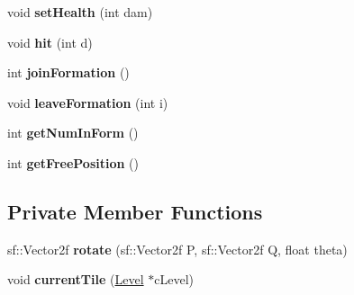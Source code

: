 \begin{DoxyCompactItemize}
void {\bfseries set\+Health} (int dam)
\item 
\mbox{\label{class_player_aafd5c7053af0b22d8ab1235efbc99635}} 
void {\bfseries hit} (int d)
\item 
\mbox{\label{class_player_add99cecd25ff0a29010c6d87c419c990}} 
int {\bfseries join\+Formation} ()
\item 
\mbox{\label{class_player_aec11a56f2f445d25d39cc67609bafbf3}} 
void {\bfseries leave\+Formation} (int i)
\item 
\mbox{\label{class_player_afe599740ba70a105db44bc4bbb9cbbc7}} 
int {\bfseries get\+Num\+In\+Form} ()
\item 
\mbox{\label{class_player_a2499ac296a8437ee4bec6c0bd47f2f5b}} 
int {\bfseries get\+Free\+Position} ()
\end{DoxyCompactItemize}
\subsection*{Private Member Functions}
\begin{DoxyCompactItemize}
\item 
\mbox{\label{class_player_a5419a17a9a89eb5a1db87dedb8b4ff67}} 
sf\+::\+Vector2f {\bfseries rotate} (sf\+::\+Vector2f P, sf\+::\+Vector2f Q, float theta)
\item 
\mbox{\label{class_player_a05ce846b9e86ad62b7ce8338e1f0ed57}} 
void {\bfseries current\+Tile} (\mbox{\hyperlink{class_level}{Level}} $\ast$c\+Level)
\end{DoxyCompactItemize}
